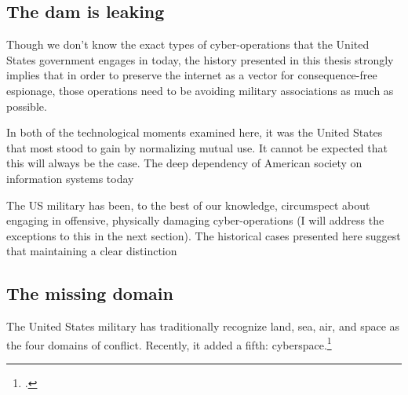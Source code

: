 \documentclass{report}
\begin{document}
\subsection{The dam is leaking}

Though we don't know the exact types of cyber-operations that the United States government engages in today, the history presented in this thesis strongly implies that in order to preserve the internet as a vector for consequence-free espionage, those operations need to be avoiding military associations as much as possible.

In both of the technological moments examined here, it was the United States that most stood to gain by normalizing mutual use. It cannot be expected that this will always be the case. The deep dependency of American society on information systems today

The US military has been, to the best of our knowledge, circumspect about engaging in offensive, physically damaging cyber-operations (I will address the exceptions to this in the next section). The historical cases presented here suggest that maintaining a clear distinction

\subsection{The missing domain}
The United States military has traditionally recognize land, sea, air, and space as the four domains of conflict. Recently, it added a fifth: cyberspace.\footcite{carafano_americas_2018}
\end{document}
